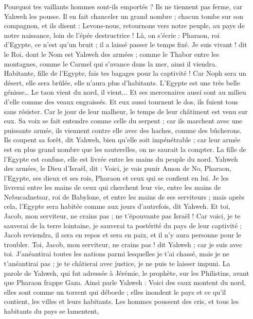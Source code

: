 \begin{multicols}{2}
Pourquoi tes vaillants hommes sont-ils emportés ? Ils ne tiennent pas ferme, car Yahweh les pousse.
Il en fait chanceler un grand nombre ; chacun tombe sur son compagnon, et ils disent : Levons-nous, retournons vers notre peuple, au pays de notre naissance, loin de l'épée destructrice !
Là, on s’écrie : Pharaon, roi d’Egypte, ce n'est qu’un bruit ; il a laissé passer le temps fixé.
Je suis vivant ! dit le Roi, dont le Nom est Yahweh des armées ; comme le Thabor entre les montagnes, comme le Carmel qui s’avance dans la mer, ainsi il viendra.
Habitante, fille de l'Egypte, fais tes bagages pour la captivité ! Car Noph sera un désert, elle sera brûlée, elle n’aura plus d'habitants.
L'Egypte est une très belle génisse… Le taon vient du nord, il vient...
Et ses mercenaires aussi sont au milieu d’elle comme des veaux engraissés. Et eux aussi tournent le dos, ils fuient tous sans résister. Car le jour de leur malheur, le temps de leur châtiment est venu sur eux.
Sa voix se fait entendre comme celle du serpent ; car ils marchent avec une puissante armée, ils viennent contre elle avec des haches, comme des bûcherons.
Ils coupent sa forêt, dit Yahweh, bien qu’elle soit impénétrable ; car leur armée est en plus grand nombre que les sauterelles, on ne saurait la compter.
La fille de l’Egypte est confuse, elle est livrée entre les mains du peuple du nord.
Yahweh des armées, le Dieu d'Israël, dit : Voici, je vais punir Amon de No, Pharaon, l'Egypte, ses dieux et ses rois, Pharaon et ceux qui se confient en lui.
Je les livrerai entre les mains de ceux qui cherchent leur vie, entre les mains de Nebucadnetsar, roi de Babylone, et entre les mains de ses serviteurs ; mais après cela, l’Egypte sera habitée comme aux jours d’autrefois, dit Yahweh.
Et toi, Jacob, mon serviteur, ne crains pas ; ne t’épouvante pas Israël ! Car voici, je te sauverai de la terre lointaine, je sauverai ta postérité du pays de leur captivité ; Jacob reviendra, il sera en repos et sera en paix, et il n'y aura personne pour le troubler.
Toi, Jacob, mon serviteur, ne crains pas ! dit Yahweh ; car je suis avec toi. J’anéantirai toutes les nations parmi lesquelles je t'ai chassé, mais je ne t’anéantirai pas ; je te châtierai avec justice, je ne puis te laisser impuni.
\VerseOne{}La parole de Yahweh, qui fut adressée à Jérémie, le prophète, sur les Philistins, avant que Pharaon frappe Gaza.
Ainsi parle Yahweh : Voici des eaux montent du nord, elles sont comme un torrent qui déborde ; elles inondent le pays et ce qu’il contient, les villes et leurs habitants. Les hommes poussent des cris, et tous les habitants du pays se lamentent,

\end{multicols}
